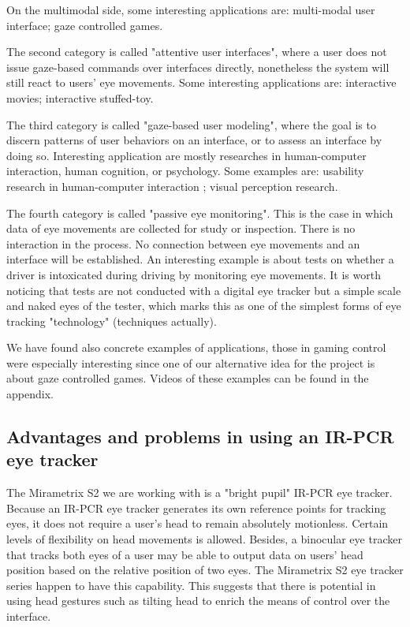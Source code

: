 \documentclass[english]{tktltiki}
\begin{document}
On the multimodal side, some interesting applications are: multi-modal user interface\cite{538404}\cite{maglio2000}; gaze controlled games\cite{Isokoski:2009:GCG:1667488.1667491}. 

The second category is called "attentive user interfaces", where a user does not issue gaze-based commands over interfaces directly, nonetheless the system will still react to users' eye movements. Some interesting applications are: interactive movies\cite{doi:10.1080/14626260500476523}; interactive stuffed-toy\cite{Yonezawa:2007:GBS:1322192.1322218}.

The third category is called "gaze-based user modeling", where the goal is to discern patterns of user behaviors on an interface, or to assess an interface by doing so. Interesting application are mostly researches in human-computer interaction, human cognition, or psychology. Some examples are: usability research in human-computer interaction \cite{Poole05eyetracking} \cite{Jacob2003573}; visual perception research\cite{John2004}.

The fourth category is called "passive eye monitoring". This is the case in which data of eye movements are collected for study or inspection. There is no interaction in the process. No connection between eye movements and an interface will be established. An interesting example is about tests on whether a driver is intoxicated during driving by monitoring eye movements\cite{Busloff1993}. It is worth noticing that tests are not conducted with a digital eye tracker but a simple scale and naked eyes of the tester, which marks this as one of the simplest forms of eye tracking "technology" (techniques actually).

We have found also concrete examples of applications, those in gaming control were especially interesting since one of our alternative idea for the project is about gaze controlled games. Videos of these examples can be found in the appendix. 

\subsection{Advantages and problems in using an IR-PCR eye tracker}

The Mirametrix S2 we are working with is a "bright pupil" IR-PCR eye tracker. Because an IR-PCR eye tracker generates its own reference points for tracking eyes, it does not require a user's head to remain absolutely motionless. Certain levels of flexibility on head movements is allowed. Besides, a binocular eye tracker that tracks both eyes of a user may be able to output data on users' head position based on the relative position of two eyes. The Mirametrix S2 eye tracker series happen to have this capability. This suggests that there is potential in using head gestures such as tilting head to enrich the means of control over the interface. 
\end{document}
